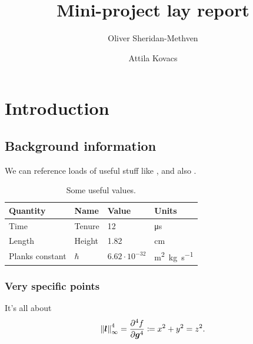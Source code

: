 \documentclass{infommlay}
\title{Mini-project lay report}
\author{Oliver Sheridan-Methven \and Attila Kovacs}
\begin{document}
\maketitle\restoregeometry\maketoc\restoregeometry%


\section{Introduction}
\subsection{Background information}

\lipsum[2]

We can reference loads of useful stuff like , and also .

\begin{table}[htb]
    \centering
	\begin{tabular}{llll}
		\toprule
    	Quantity        & Name      & Value                 & Units                                \\ \midrule
    	Time            & Tenure    & 12                    & \si{\micro\second}                   \\
    	Length          & Height    & 1.82                  & \si{\centi\meter}                    \\
    	Planks constant & $ \hbar $ & $ 6.62\cdot10^{-32} $ & \si{\meter^2.\kilogram.\second^{-1}} \\\bottomrule
    \end{tabular}
    \caption{Some useful values.}
    \label{tab:some_useful_values}
\end{table}


\subsubsection{Very specific points}
\lipsum[75] It's all about 
\begin{equation}
 \norm{\bm{l}}_\infty^4 = \pdv[4]{f}{\bm{g}}\coloneqq x^2 + y^2 = z^2.
\end{equation}
\end{document}
